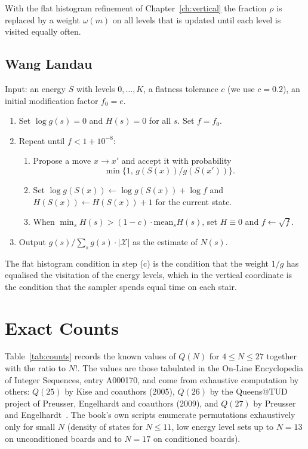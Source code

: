 \documentclass[11pt,twoside,openany]{book}
\theoremstyle{plain}
\theoremstyle{definition}
\theoremstyle{remark}
\newcommand{\cX}{\mathcal{X}}
\begin{document}
With the flat histogram refinement of Chapter~\ref{ch:vertical} the fraction $\rho$ is replaced by a weight $\omega(m)$ on all levels that is updated until each level is visited equally often.

\section{Wang Landau}

Input: an energy $S$ with levels $0, \dots, K$, a flatness tolerance $c$ (we use $c = 0.2$), an initial modification factor $f_0 = e$.

\begin{enumerate}
\item Set $\log g(s) = 0$ and $H(s) = 0$ for all $s$. Set $f = f_0$.
\item Repeat until $f < 1 + 10^{-8}$:
\begin{enumerate}
\item Propose a move $x \to x'$ and accept it with probability
\[ \min\{1, \, g(S(x)) / g(S(x'))\}. \]
\item Set $\log g(S(x)) \leftarrow \log g(S(x)) + \log f$ and $H(S(x)) \leftarrow H(S(x)) + 1$ for the current state.
\item When $\min_s H(s) > (1 - c) \cdot \mathrm{mean}_s H(s)$, set $H \equiv 0$ and $f \leftarrow \sqrt f$.
\end{enumerate}
\item Output $g(s) / \sum_s g(s) \cdot |\cX|$ as the estimate of $N(s)$.
\end{enumerate}

The flat histogram condition in step (c) is the condition that the weight $1/g$ has equalised the visitation of the energy levels, which in the vertical coordinate is the condition that the sampler spends equal time on each stair.

\chapter{Exact Counts}
\label{app:counts}

Table~\ref{tab:counts} records the known values of $Q(N)$ for $4 \le N \le 27$ together with the ratio to $N!$. The values are those tabulated in the On-Line Encyclopedia of Integer Sequences, entry A000170, and come from exhaustive computation by others: $Q(25)$ by Kise and coauthors (2005), $Q(26)$ by the Queens@TUD project of Preusser, Engelhardt and coauthors (2009), and $Q(27)$ by Preusser and Engelhardt~\cite{PreusserEngelhardt}. The book's own scripts enumerate permutations exhaustively only for small $N$ (density of states for $N \le 11$, low energy level sets up to $N = 13$ on unconditioned boards and to $N = 17$ on conditioned boards).
\end{document}
